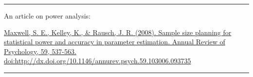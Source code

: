 \documentclass[openany]{book}
\begin{document}
\begin{center}\rule{0.5\linewidth}{0.5pt}\end{center}

An article on power analysis:

\href{https://ezproxy.callutheran.edu/login?url=https://search-proquest-com.ezproxy.callutheran.edu/docview/205846542?accountid=9839}{Maxwell, S. E., Kelley, K., \& Rausch, J. R. (2008). Sample size planning for statistical power and accuracy in parameter estimation. Annual Review of Psychology, 59, 537-563. doi:http://dx.doi.org/10.1146/annurev.psych.59.103006.093735}

\begin{center}\rule{0.5\linewidth}{0.5pt}\end{center}


\end{document}
